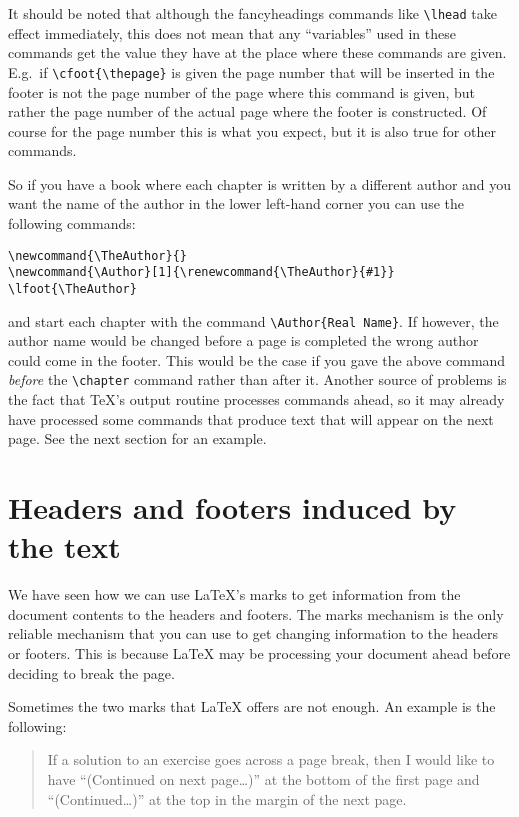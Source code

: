 \documentclass[a4paper]{article}
\def\latex/{\protect\LaTeX{}}
\def\tex/{\TeX}
\begin{document}
It should be noted that although the \textsf{fancyheadings} commands like
\verb|\lhead| take effect immediately, this does not mean that any
``variables'' used in these commands get the value they have at the place
where these commands are given. E.g.\ if \verb|\cfoot{\thepage}| is given
the page number that will be inserted in the footer is not the page number
of the page where this command is given, but rather the page number of
the actual page where the footer is constructed. Of course for the page
number this is what you expect, but it is also true for other commands.

So if you have a book where each chapter is written by a different author
and you want the name of the author in the lower left-hand corner you can
use the following commands:

\begin{verbatim}
\newcommand{\TheAuthor}{}
\newcommand{\Author}[1]{\renewcommand{\TheAuthor}{#1}}
\lfoot{\TheAuthor}
\end{verbatim}

\noindent and start each chapter with the command 
\verb|\Author{Real Name}|.
 If however, the author name would be changed before a page is
completed the wrong author could come in the footer. This would be the case
if you gave the above command \emph{before} the \verb|\chapter| command
rather than after it. 
Another source of problems is the fact that \tex/'s output routine processes
commands ahead, so it may already have processed some commands that produce
text that will appear on the next page. See the next section for an example.

\section{Headers and footers induced by the text}
\label{sec:xmarks}

We have seen how we can use \LaTeX's marks to get information from the
document contents to the headers and footers. The marks mechanism is the
only reliable mechanism that you can use to get changing information to the
headers or footers. This is because \latex/ may be processing your document
ahead before deciding to break the page. 

Sometimes the two marks that \latex/ offers are not enough. An example is
the following:
\begin{quote}
 If a solution to an exercise goes across a page break, then I would like
 to have ``(Continued on next page\ldots)'' at the bottom of the
 first page and ``(Continued\ldots)'' at the top in the margin of the next page.
\end{quote}
\end{document}
